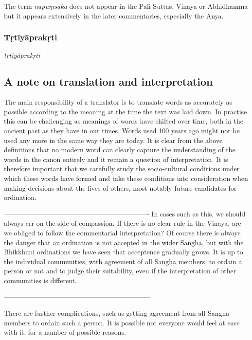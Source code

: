 \medskip


The term {\em napuṃsaka} does not appear in the Pali Suttas, Vinaya or Abhidhamma but it appears extensively in the later commentaries, especially the Anya. 

\subsubsection{Tṛtīyāprakṛti}

{\em tṛtīyāprakṛti}


\subsection{A note on translation and interpretation}
The main responsibility of a translator is to translate words as accurately as possible according to the meaning at the time the text was laid down. In practise this can be challenging as meanings of words have shifted over time, both in the ancient past as they have in our times. Words used 100 years ago might not be used any more in the same way they are today. It is clear from the above definitions that no modern word can clearly capture the understanding of the words in the canon entirely and it remain a question of interpretation. It is therefore important that we carefully study the socio-cultural conditions under which these words have formed and take these conditions into consideration when making decisions about the lives of others, most notably future candidates for ordination.


----------------------------------------------------------------
In cases such as this, we should always err on the side of compassion. If there is no clear rule in the Vinaya, are we obliged to follow the commentarial interpretation? Of course there is always the danger that an ordination is not accepted in the wider Sangha, but with the Bhikkhuni ordinations we have seen that acceptence gradually grows. It is up to the individual communities, with agreement of all Sangha members, to ordain a person or not and to judge their suitability, even if the interpretation of other communities is different. 



-----------------------------------------------------------------




There are further complications, such as getting agreement from all Sangha members to ordain such a person. It is possible not everyone would feel at ease with it, for a number of possible reasons.
